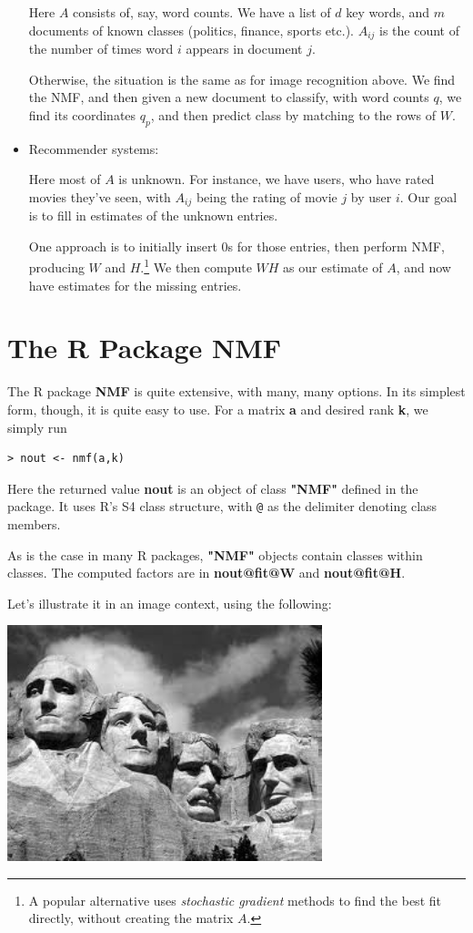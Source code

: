 \begin{itemize}
Here $A$ consists of, say, word counts. We have a list of $d$ key words,
and $m$ documents of known classes (politics, finance, sports etc.).
$A_{ij}$ is the count of the number of times word $i$ appears in
document $j$.

Otherwise, the situation is the same as for image recognition above.  We
find the NMF, and then given a new document to classify, with word
counts $q$, we find its coordinates $q_p$, and then predict class by
matching to the rows of $W$.

\item Recommender systems:

Here most of $A$ is unknown.  For instance, we have users, who have
rated movies they've seen, with $A_{ij}$ being the rating of movie $j$
by user $i$.  Our goal is to fill in estimates of the unknown entries.

One approach is to initially insert 0s for those entries, then perform
NMF, producing $W$ and $H$.\footnote{A popular alternative uses {\it
stochastic gradient} methods to find the best fit directly, without
creating the matrix $A$.} We then compute $WH$ as our estimate of $A$,
and now have estimates for the missing entries.

\end{itemize}

\section{The R Package NMF}

The R package {\bf NMF} is quite extensive, with many, many options.  In
its simplest form, though, it is quite easy to use.  For a matrix {\bf
a} and desired rank {\bf k}, we simply run

\begin{lstlisting}
> nout <- nmf(a,k)
\end{lstlisting}

Here the returned value {\bf nout} is an object of class {\bf "NMF"}
defined in the package.  It uses R's S4 class structure, with
\lstinline{@} as the delimiter denoting class members.  

As is the case in many R packages, {\bf "NMF"} objects contain classes
within classes.  The computed factors are in {\bf nout@fit@W} and {\bf
nout@fit@H}.

Let's illustrate it in an image context, using the following:

\includegraphics[width=3.6in]{Images/MtRush.png}

